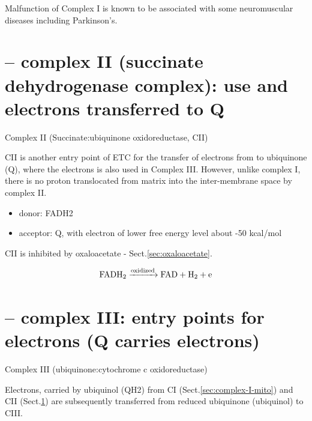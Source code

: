 Malfunction of Complex I is known to be associated with some neuromuscular
diseases including Parkinson's.
%
%

\section{-- complex II (succinate dehydrogenase complex): use  and
electrons transferred to Q}
\label{sec:complex-II-mito}

Complex II (Succinate:ubiquinone oxidoreductase, CII)

CII is another entry point of ETC for the transfer of electrons from
 to ubiquinone (Q), where the electrons is also used in Complex III.
However, unlike complex I, there is no proton translocated from matrix into
the inter-membrane space by complex II.
\begin{itemize}
  \item donor: FADH2

  \item acceptor: Q, with electron of lower free energy level about -50 kcal/mol
\end{itemize}

CII is inhibited by oxaloacetate - Sect.\ref{sec:oxaloacetate}.

  \begin{equation}
    \label{eq:12b}
      \ce{FADH2 ->[oxidized] FAD + H2 + e}
  \end{equation}

\section{-- complex III: entry points for electrons (Q carries electrons)}
\label{sec:complex-III-mito}

Complex III (ubiquinone:cytochrome c oxidoreductase)

Electrons, carried by ubiquinol (QH2) from CI (Sect.\ref{sec:complex-I-mito})
and CII (Sect.\ref{sec:complex-II-mito}) are subsequently transferred from reduced
ubiquinone (ubiquinol) to CIII.

